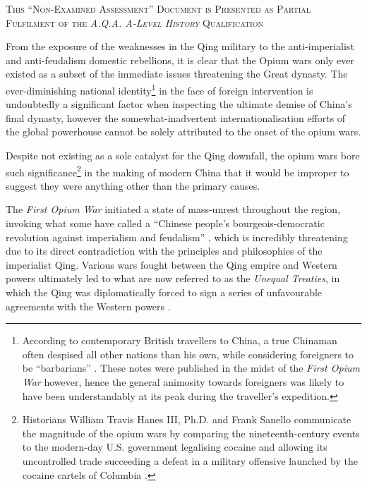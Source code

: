 \documentclass[a4paper,oneside]{article}
\newcommand{\textrule}{\noindent\makebox[\linewidth]{\rule{\linewidth}{0.4pt}}}
\begin{document}
\textrule%
\vspace*{0.6em}
{\centering \textsc{This ``Non-Examined Assessment'' Document is Presented as Partial Fulfilment of the \textit{A.Q.A. A-Level History} Qualification}\\}
\textrule%
\vspace*{0.6em}

        From the exposure of the weaknesses in the Qing military to the anti-imperialist and anti-feudalism domestic rebellions, it is clear that the Opium wars only ever existed as a subset of the immediate issues threatening the Great dynasty. The ever-diminishing national identity\footnote{According to contemporary British travellers to China, a true Chinaman often despised all other nations than his own, while considering foreigners to be ``barbarians'' \autocite{McPherson:1842}. These notes were published in the midst of the \textit{First Opium War} however, hence the general animosity towards foreigners was likely to have been understandably at its peak during the traveller's expedition.} in the face of foreign intervention is undoubtedly a significant factor when inspecting the ultimate demise of China's final dynasty, however the somewhat-inadvertent internationalisation efforts of the global powerhouse cannot be solely attributed to the onset of the opium wars.

        Despite not existing as a sole catalyst for the Qing downfall, the opium wars bore such significance\footnote{Historians William Travis Hanes III, Ph.D. and Frank Sanello communicate the magnitude of the opium wars by comparing the nineteenth-century events to the modern-day U.S. government legalising cocaine and allowing its uncontrolled trade succeeding a defeat in a military offensive launched by the cocaine cartels of Columbia \autocite{Hanes:2004}.} in the making of modern China that it would be improper to suggest they were anything other than the primary causes.

        The \textit{First Opium War} initiated a state of mass-unrest throughout the region, invoking what some have called a ``Chinese people's bourgeois-democratic revolution against imperialism and feudalism'' \autocite{Janin:1999}, which is incredibly threatening due to its direct contradiction with the principles and philosophies of the imperialist Qing. Various wars fought between the Qing empire and Western powers ultimately led to what are now referred to as the \textit{Unequal Treaties}, in which the Qing was diplomatically forced to sign a series of unfavourable agreements with the Western powers \autocite{Wang:2005}.
\end{document}
